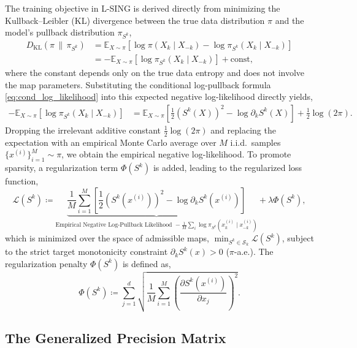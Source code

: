\documentclass[11pt,a4paper]{article}
\theoremstyle{plain}
\theoremstyle{definition}
\theoremstyle{remark}
\begin{document}
The training objective in L-SING is derived directly from minimizing the Kullback--Leibler (KL) divergence between the true data distribution $\pi$ and the model's pullback distribution $\pi_{S^k}$,
\begin{align}
    D_{\mathrm{KL}}(\pi \,\|\, \pi_{S^k}) &= \mathbb{E}_{X \sim \pi}\left[ \log \pi(X_k \mid X_{-k}) - \log \pi_{S^k}(X_k \mid X_{-k}) \right] \\
    &= -\mathbb{E}_{X \sim \pi}\left[ \log \pi_{S^k}(X_k \mid X_{-k}) \right] + \mathrm{const},
\end{align}
where the constant depends only on the true data entropy and does not involve the map parameters. Substituting the conditional log-pullback formula \eqref{eq:cond_log_likelihood} into this expected negative log-likelihood directly yields,
\begin{align}
    -\mathbb{E}_{X \sim \pi}\left[ \log \pi_{S^k}(X_k \mid X_{-k}) \right] &= \mathbb{E}_{X \sim \pi}\left[ \frac{1}{2}(S^k(X))^2 - \log \partial_k S^k(X) \right] + \frac{1}{2}\log(2\pi).
\end{align}
Dropping the irrelevant additive constant $\frac{1}{2}\log(2\pi)$ and replacing the expectation with an empirical Monte Carlo average over $M$ i.i.d.\ samples $\{x^{(i)}\}_{i=1}^M \sim \pi$, we obtain the empirical negative log-likelihood. To promote sparsity, a regularization term $\Phi(S^k)$ is added, leading to the regularized loss function,
\begin{equation}
    \mathcal{L}(S^k) \coloneqq \underbrace{\frac{1}{M} \sum_{i=1}^M \left[ \frac{1}{2} (S^k(x^{(i)}))^2 - \log \partial_k S^k(x^{(i)}) \right]}_{\text{Empirical Negative Log-Pullback Likelihood } -\frac{1}{M}\sum_i \log \pi_{S^k}(x^{(i)}_k \mid x^{(i)}_{-k})} + \lambda \Phi(S^k),
    \label{eq:lsing_objective}
\end{equation}
which is minimized over the space of admissible maps, $\min_{S^k \in \mathcal{S}_k} \mathcal{L}(S^k)$, subject to the strict target monotonicity constraint $\partial_k S^k(x) > 0$ ($\pi$-a.e.). The regularization penalty $\Phi(S^k)$ is defined as,
\begin{equation}
    \Phi(S^k) \coloneqq \sum_{j=1}^d \sqrt{ \frac{1}{M} \sum_{i=1}^M \left( \frac{\partial S^k(x^{(i)})}{\partial x_j} \right)^2 }.
    \label{eq:rosasco_penalty}
\end{equation}

\subsection{The Generalized Precision Matrix}
\end{document}
